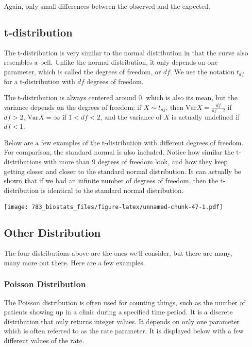 \documentclass[]{book}
\theoremstyle{definition}
\theoremstyle{definition}
\theoremstyle{definition}
\theoremstyle{remark}
\begin{document}
Again, only small differences between the observed and the expected.

\hypertarget{t-distribution}{%
\subsection{t-distribution}\label{t-distribution}}

The t-distribution is very similar to the normal distribution in that the curve also resembles a bell. Unlike the normal distribution, it only depends on one parameter, which is called the degrees of freedom, or \(df\). We use the notation \(t_{df}\) for a t-distribution with \(df\) degrees of freedom.

The t-distribution is always centered around \(0\), which is also its mean, but the variance depends on the degrees of freedom: if \(X \sim t_{df}\), then \(\text{Var}{X} = \frac{df}{df-2}\) if \(df > 2\), \(\text{Var}{X} = \infty\) if \(1 < df < 2\), and the variance of \(X\) is actually undefined if \(df < 1\).

Below are a few examples of the t-distribution with different degrees of freedom. For comparison, the standard normal is also included. Notice how similar the t-distributions with more than 9 degrees of freedom look, and how they keep getting closer and closer to the standard normal distribution. It can actually be shown that if we had an infinite number of degrees of freedom, then the t-distribution is identical to the standard normal distribution.

\texttt{[image: 783\_biostats\_files/figure-latex/unnamed-chunk-47-1.pdf]}

\hypertarget{other-distribution}{%
\subsection{Other Distribution}\label{other-distribution}}

The four distributions above are the ones we'll consider, but there are many, many more out there. Here are a few examples.

\hypertarget{poisson-distribution}{%
\subsubsection{Poisson Distribution}\label{poisson-distribution}}

The Poisson distribution is often used for counting things, such as the number of patients showing up in a clinic during a specified time period. It is a discrete distribution that only returns integer values. It depends on only one parameter which is often referred to as the rate parameter. It is displayed below with a few different values of the rate.
\end{document}
